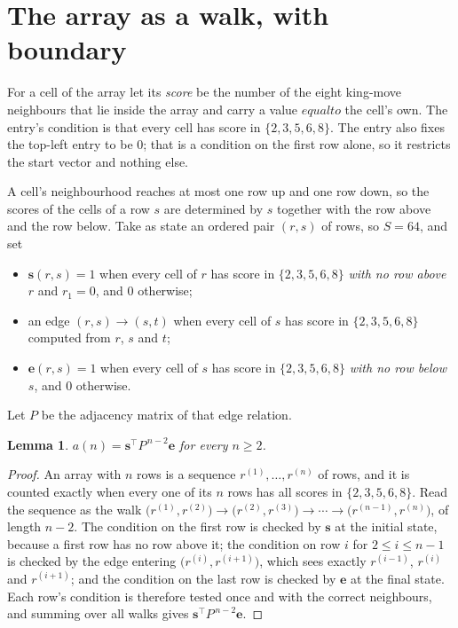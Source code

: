 \documentclass[11pt,a4paper]{article}
\theoremstyle{plain}
\newtheorem{lemma}[theorem]{Lemma}
\theoremstyle{definition}
\begin{document}
\section{The array as a walk, with boundary}

For a cell of the array let its \emph{score} be the number of the eight king-move neighbours that lie inside
the array and carry a value $equal to$ the cell's own. The entry's condition is that every cell
has score in $\{2,3,5,6,8\}$. The entry also fixes the top-left entry to be $0$; that is a condition on the first row alone, so it restricts the start vector and nothing else.

A cell's neighbourhood reaches at most one row up and one row down, so the scores of the
cells of a row $s$ are determined by $s$ together with the row above and the row below.
Take as state an ordered pair $(r,s)$ of rows, so $S=64$, and set
\begin{itemize}
\item $\mathbf{s}(r,s)=1$ when every cell of $r$ has score in $\{2,3,5,6,8\}$ \emph{with no row
above $r$} and $r_1=0$, and $0$ otherwise;
\item an edge $(r,s)\to(s,t)$ when every cell of $s$ has score in $\{2,3,5,6,8\}$ computed from
$r$, $s$ and $t$;
\item $\mathbf{e}(r,s)=1$ when every cell of $s$ has score in $\{2,3,5,6,8\}$ \emph{with no row
below $s$}, and $0$ otherwise.
\end{itemize}
Let $P$ be the adjacency matrix of that edge relation.

\begin{lemma}\label{lem:walk}
$a(n)=\mathbf{s}^{\!\top}P^{\,n-2}\mathbf{e}$ for every $n\ge2$.
\end{lemma}

\begin{proof}
An array with $n$ rows is a sequence $r^{(1)},\dots,r^{(n)}$ of rows, and it is counted
exactly when every one of its $n$ rows has all scores in $\{2,3,5,6,8\}$. Read the sequence as the
walk $\bigl(r^{(1)},r^{(2)}\bigr)\to\bigl(r^{(2)},r^{(3)}\bigr)\to\cdots\to
\bigl(r^{(n-1)},r^{(n)}\bigr)$, of length $n-2$. The condition on the first row is
checked by $\mathbf{s}$ at the initial state, because a first row has no row above it; the
condition on row $i$ for $2\le i\le n-1$ is checked by the edge entering
$\bigl(r^{(i)},r^{(i+1)}\bigr)$, which sees exactly $r^{(i-1)}$, $r^{(i)}$ and
$r^{(i+1)}$; and the condition on the last row is checked by $\mathbf{e}$ at the final
state. Each row's condition is therefore tested once and with the correct neighbours, and
summing over all walks gives $\mathbf{s}^{\!\top}P^{\,n-2}\mathbf{e}$.
\end{proof}
\end{document}
